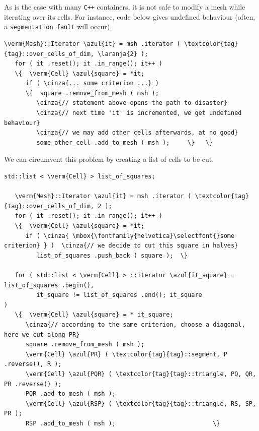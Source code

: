 As is the case with many {\tt C++} containers, it is not safe to modify a mesh while
iterating over its cells.
For instance, code below gives undefined behaviour (often, a {\small\tt segmentation fault}
will occur).

\begin{Verbatim}[commandchars=\\\{\},formatcom=\small\tt,frame=single,
   label=incorrect code !,rulecolor=\color{moldura},
   baselinestretch=0.94,framesep=2mm]
   \verm{Mesh}::Iterator \azul{it} = msh .iterator ( \textcolor{tag}{tag}::over_cells_of_dim, \laranja{2} );
   for ( it .reset(); it .in_range(); it++ )
   \{  \verm{Cell} \azul{square} = *it;
      if ( \cinza{... some criterion ...} )
      \{  square .remove_from_mesh ( msh );
         \cinza{// statement above opens the path to disaster}
         \cinza{// next time 'it' is incremented, we get undefined behaviour}
         \cinza{// we may add other cells afterwards, at no good}
         some_other_cell .add_to_mesh ( msh );     \}   \}
\end{Verbatim}

We can circumvent this problem by creating a list of cells to be cut.

\begin{Verbatim}[commandchars=\\\{\},formatcom=\small\tt,frame=single,
   label=parag-\ref{\numb section 10.\numb parag 3}.cpp,rulecolor=\color{moldura},
   baselinestretch=0.94,framesep=2mm]
   std::list < \verm{Cell} > list_of_squares;

   \verm{Mesh}::Iterator \azul{it} = msh .iterator ( \textcolor{tag}{tag}::over_cells_of_dim, 2 );
   for ( it .reset(); it .in_range(); it++ )
   \{  \verm{Cell} \azul{square} = *it;
      if ( \cinza{ \mbox{\fontfamily{helvetica}\selectfont{}some criterion} } )  \cinza{// we decide to cut this square in halves}
         list_of_squares .push_back ( square );  \}

   for ( std::list < \verm{Cell} > ::iterator \azul{it_square} = list_of_squares .begin(),
         it_square != list_of_squares .end(); it_square               )
   \{  \verm{Cell} \azul{square} = * it_square;
      \cinza{// according to the same criterion, choose a diagonal, here we cut along PR}
      square .remove_from_mesh ( msh );
      \verm{Cell} \azul{PR} ( \textcolor{tag}{tag}::segment, P .reverse(), R );
      \verm{Cell} \azul{PQR} ( \textcolor{tag}{tag}::triangle, PQ, QR, PR .reverse() );
      PQR .add_to_mesh ( msh );
      \verm{Cell} \azul{RSP} ( \textcolor{tag}{tag}::triangle, RS, SP, PR );
      RSP .add_to_mesh ( msh );                           \}
\end{Verbatim}


